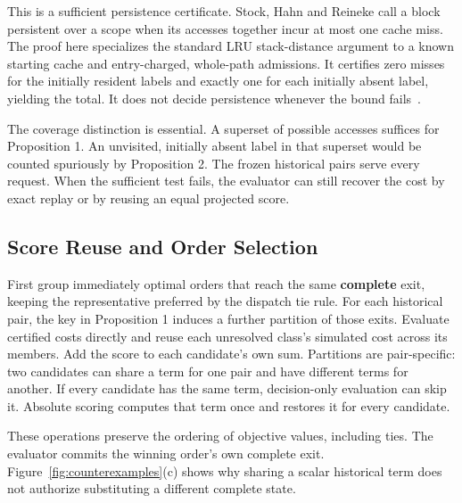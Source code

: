 \documentclass[11pt,letterpaper]{article}
\begin{document}
This is a sufficient persistence certificate. Stock, Hahn and Reineke call a block persistent over a scope when its accesses together incur at most one cache miss. The proof here specializes the standard LRU stack-distance argument to a known starting cache and entry-charged, whole-path admissions. It certifies zero misses for the initially resident labels and exactly one for each initially absent label, yielding the total. It does not decide persistence whenever the bound fails~\cite{stock,mattson}.

The coverage distinction is essential. A superset of possible accesses suffices for Proposition 1. An unvisited, initially absent label in that superset would be counted spuriously by Proposition 2. The frozen historical pairs serve every request. When the sufficient test fails, the evaluator can still recover the cost by exact replay or by reusing an equal projected score.

\subsection{Score Reuse and Order Selection}

First group immediately optimal orders that reach the same \textbf{complete} exit, keeping the representative preferred by the dispatch tie rule. For each historical pair, the key in Proposition 1 induces a further partition of those exits. Evaluate certified costs directly and reuse each unresolved class's simulated cost across its members. Add the score to each candidate's own sum. Partitions are pair-specific: two candidates can share a term for one pair and have different terms for another. If every candidate has the same term, decision-only evaluation can skip it. Absolute scoring computes that term once and restores it for every candidate.

These operations preserve the ordering of objective values, including ties. The evaluator commits the winning order's own complete exit. Figure~\ref{fig:counterexamples}(c) shows why sharing a scalar historical term does not authorize substituting a different complete state.
\end{document}
